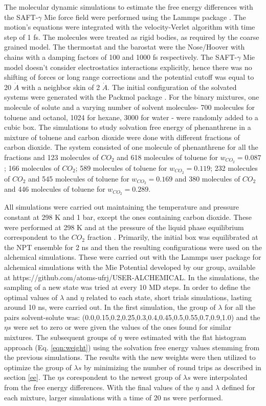 The molecular dynamic simulations to estimate the free energy differences with the SAFT-$\gamma$ Mie force field were performed using the Lammps package \cite{lammps}. The motion's equations were integrated with the velocity-Verlet algorithm \cite{verlet} with time step of 1 fs. The molecules were treated as rigid bodies, as required by the coarse grained model. The thermostat and the barostat were the Nose/Hoover with chains with a damping factors of 100 and 1000 fs respectively. The SAFT-$\gamma$ Mie model doesn't consider electrostatics interactions explicitly, hence there was no shifting of forces or long range corrections and the potential cutoff was equal to 20 $\dot{A}$ with a neighbor skin of 2 $\dot{A}$. The initial configuration of the  solvated systems were generated with the Packmol package \cite{packmol}. For the binary mixtures, one molecule of solute and a varying number of solvent molecules- 700 molecules for toluene and octanol, 1024 for hexane, 3000 for water - were randomly added to a cubic box. The simulations to study solvation free energy of phenanthrene in a mixture of toluene and carbon dioxide were done with different fractions of carbon dioxide. The  system consisted of one molecule of phenanthrene for all the fractions and 123 molecules of $CO_{2}$ and 618 molecules of toluene for $w_{CO_{2}} = 0.087$; 166 molecules of $CO_{2}$; 589 molecules of toluene for $w_{CO_{2}} = 0.119$; 232 molecules of $CO_{2}$ and 545 molecules of toluene for $w_{CO_{2}} = 0.169$ and 380 molecules of $CO_{2}$ and 446 molecules of toluene for $w_{CO_{2}} = 0.289$.

All simulations were carried out maintaining the temperature and pressure constant at 298 K and 1 bar, except the ones containing carbon dioxide. These were performed at 298 K and at the pressure of the liquid phase equilibrium correspondent to the $CO_{2}$ fraction \cite{co2toliq}. Primarily, the initial box was equilibrated at the NPT ensemble for 2 ns and then the resulting configurations were used on the alchemical simulations. These were carried out with the Lammps user package for alchemical simulations with the Mie Potential developed by our group, available at https://github.com/atoms-ufrj/USER-ALCHEMICAL. In the simulations, the sampling of a new state was tried at every 10 MD steps. In order to define the optimal values of $\lambda$ and $\eta$ related to each state, short trials simulations, lasting around 10 ns, were carried out. In the first simulation, the group of $\lambda$ for all the pairs solvent-solute was: (0.0,0.15,0.2,0.25,0.3,0.4,0.45,0.5,0.55,0.7,0.9,1.0) and the $\eta s$ were set to zero or were given the values of the ones found for similar mixtures. The subsequent groups of $\eta$ were estimated  with the flat histogram approach (Eq. \eqref{eqn:weight}) using the solvation free energy values stemming from the previous simulations. The results with the new weights were then utilized to optimize the group of $\lambda s$ by minimizing the number of round trips as described in section \ref{ee}. The $\eta s$ corespondent to the newest group of $\lambda s$ were interpolated from the free energy differences. With the final values of the $\eta$ and $\lambda $ defined for each mixture, larger simulations with a time of 20 ns were performed. 

